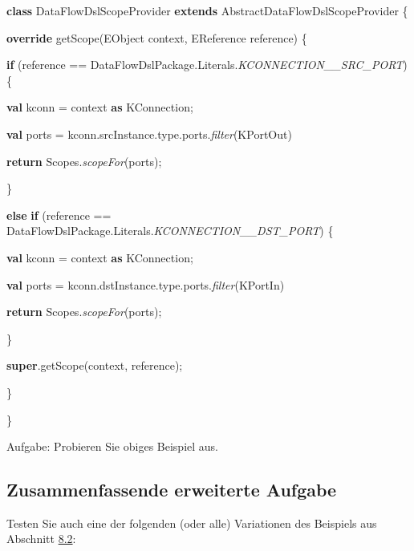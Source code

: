 \documentclass[a4]{article}
\begin{document}
\textbf{class} DataFlowDslScopeProvider \textbf{extends}
AbstractDataFlowDslScopeProvider \{

\textbf{override} getScope(EObject context, EReference reference) \{

\textbf{if} (reference ==
DataFlowDslPackage.Literals.\emph{KCONNECTION\_\_SRC\_PORT}) \{

\textbf{val} kconn = context \textbf{as} KConnection;

\textbf{val} ports =
kconn.srcInstance.type.ports.\emph{filter}(KPortOut)

\textbf{return} Scopes.\emph{scopeFor}(ports);

\}

\textbf{else} \textbf{if} (reference ==
DataFlowDslPackage.Literals.\emph{KCONNECTION\_\_DST\_PORT}) \{

\textbf{val} kconn = context \textbf{as} KConnection;

\textbf{val}
ports = kconn.dstInstance.type.ports.\emph{filter}(KPortIn)

\textbf{return} Scopes.\emph{scopeFor}(ports);

\}

\textbf{super}.getScope(context, reference);

\}

\}

Aufgabe: Probieren Sie obiges Beispiel aus.

\subsection[Zusammenfassende erweiterte
Aufgabe]{\texorpdfstring{\protect\hypertarget{anchor-47}{}{}Zusammenfassende
erweiterte
Aufgabe}{Zusammenfassende erweiterte Aufgabe}}\label{zusammenfassende-erweiterte-aufgabe}

Testen Sie auch eine der folgenden (oder alle) Variationen des Beispiels
aus Abschnitt \protect\hyperlink{anchor-46}{8.2}:
\end{document}
